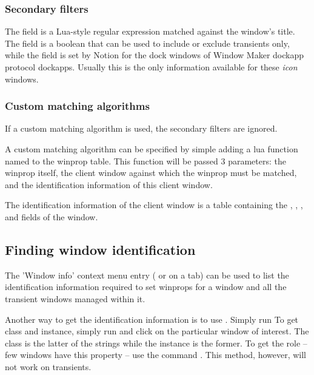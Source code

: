 \subsubsection{Secondary filters}

The  field is a Lua-style regular expression matched against
the window's title. The  field is a boolean that can
be used to include or exclude transients only, while the 
field is set by Notion for the dock windows of Window Maker dockapp protocol
dockapps. Usually this is the only information available for these 
\emph{icon} windows. 

\subsubsection{Custom matching algorithms}

If a custom matching algorithm is used, the secondary filters are ignored.

A custom matching algorithm can be specified by simple adding a lua function
named  to the winprop table. This function will be passed 3 
parameters: the winprop itself, the client window against which the winprop
must be matched, and the identification information of this client window. 

The identification information of the client window is a table containing the
,
, 
,
 and
 fields of the 
window.


\subsection{Finding window identification}

The 'Window info' context menu entry ( or  on a tab)
can be used to list the identification information required to set winprops
for a window and all the transient windows managed within it. 

Another way to get the identification information is to use .
Simply run To get class and instance, simply run 
and click on the particular window of interest. The class is the latter of
the strings while the instance is the former.  To get the role -- few
windows have this property -- use the command . 
This method, however, will not work on transients. 

